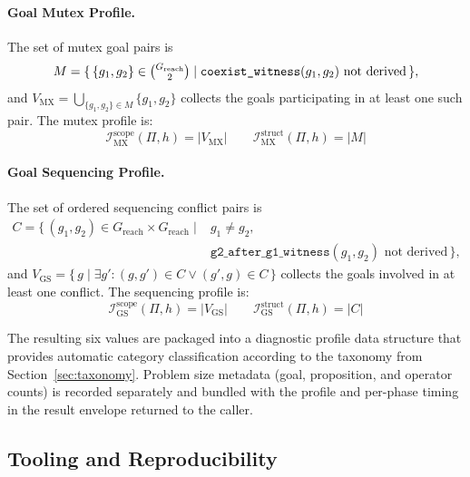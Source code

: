 \paragraph{Goal Mutex Profile.}
The set of mutex goal pairs is
\begin{equation*}
    M = \{\, \{g_1, g_2\} \in \tbinom{G_{\text{reach}}}{2} \mid \texttt{coexist\_witness}(g_1, g_2) \text{ not derived} \,\},
\end{equation*}
and $V_{\text{MX}} = \bigcup_{\{g_1, g_2\} \in M} \{g_1, g_2\}$ collects the goals participating in at least one such pair. The mutex profile is:
\begin{equation*}
    \mathcal{I}^{\text{scope}}_{\text{MX}}(\Pi, h) = |V_{\text{MX}}| \qquad \mathcal{I}^{\text{struct}}_{\text{MX}}(\Pi, h) = |M|
\end{equation*}

\paragraph{Goal Sequencing Profile.}
The set of ordered sequencing conflict pairs is
\begin{equation*}
    \begin{aligned}
        C = \{\, (g_1, g_2) \in G_{\text{reach}} \times G_{\text{reach}} \mid {} & g_1 \neq g_2,                                                       \\
                                                                                 & \texttt{g2\_after\_g1\_witness}(g_1, g_2) \text{ not derived} \,\},
    \end{aligned}
\end{equation*}
and $V_{\text{GS}} = \{\, g \mid \exists g' : (g, g') \in C \lor (g', g) \in C \,\}$ collects the goals involved in at least one conflict. The sequencing profile is:
\begin{equation*}
    \mathcal{I}^{\text{scope}}_{\text{GS}}(\Pi, h) = |V_{\text{GS}}| \qquad \mathcal{I}^{\text{struct}}_{\text{GS}}(\Pi, h) = |C|
\end{equation*}

The resulting six values are packaged into a diagnostic profile data structure that provides automatic category classification according to the taxonomy from Section~\ref{sec:taxonomy}. Problem size metadata (goal, proposition, and operator counts) is recorded separately and bundled with the profile and per-phase timing in the result envelope returned to the caller.

\subsection{Tooling and Reproducibility}
\label{sec:tooling}

